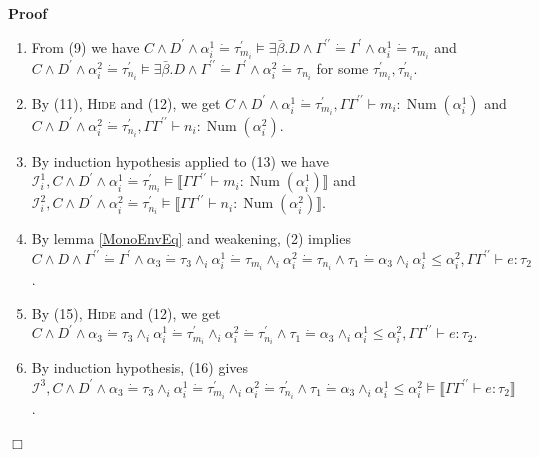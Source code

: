 \documentclass{article}
\newcommand{\tmname}[1]{\textsc{#1}}
\newcommand{\tmop}[1]{\ensuremath{\operatorname{#1}}}
\newenvironment{proof}{\noindent\textbf{Proof\ }}{\hspace*{\fill}$\Box$\medskip}
\begin{document}
\begin{proof}
\begin{itemize}
\begin{enumerate}
      \item From (9) we have $C \wedge D^{\prime} \wedge \alpha^1_i \dot{=}
      \tau_{m_i}^{\prime} \vDash \exists \bar{\beta} .D \wedge
      \Gamma^{\prime\prime} \dot{=} \Gamma^{\prime} \wedge \alpha^1_i \dot{=}
      \tau_{m_i}$ and $C \wedge D^{\prime} \wedge \alpha^2_i \dot{=}
      \tau_{n_i}^{\prime} \vDash \exists \bar{\beta} .D \wedge
      \Gamma^{\prime\prime} \dot{=} \Gamma^{\prime} \wedge \alpha^2_i \dot{=}
      \tau_{n_i}$ for some $\tau_{m_i}^{\prime}, \tau_{n_i}^{\prime}$.
      
      \item By (11), {\tmname{Hide}} and (12), we get $C \wedge D^{\prime}
      \wedge \alpha^1_i \dot{=} \tau_{m_i}^{\prime}, \Gamma
      \Gamma^{\prime\prime} \vdash m_i : \tmop{Num} (\alpha^1_i)$ and $C
      \wedge D^{\prime} \wedge \alpha^2_i \dot{=} \tau_{n_i}^{\prime}, \Gamma
      \Gamma^{\prime\prime} \vdash n_i : \tmop{Num} (\alpha^2_i)$.
      
      \item By induction hypothesis applied to (13) we have $\mathcal{I}_i^1,
      C \wedge D^{\prime} \wedge \alpha^1_i \dot{=} \tau_{m_i}^{\prime} \vDash
      \llbracket \Gamma \Gamma^{\prime\prime} \vdash m_i : \tmop{Num}
      (\alpha^1_i) \rrbracket$ and $\mathcal{I}_i^2, C \wedge D^{\prime}
      \wedge \alpha^2_i \dot{=} \tau_{n_i}^{\prime} \vDash \llbracket \Gamma
      \Gamma^{\prime\prime} \vdash n_i : \tmop{Num} (\alpha^2_i) \rrbracket$.
      
      \item By lemma \ref{MonoEnvEq} and weakening, (2) implies $C \wedge D
      \wedge \Gamma^{\prime\prime} \dot{=} \Gamma^{\prime} \wedge \alpha_3
      \dot{=} \tau_3 \wedge_i \alpha^1_i \dot{=} \tau_{m_i} \wedge_i
      \alpha^2_i \dot{=} \tau_{n_i} \wedge \tau_1 \dot{=} \alpha_3 \wedge_i
      \alpha_i^1 \leq \alpha_i^2, \Gamma \Gamma^{\prime\prime} \vdash e :
      \tau_2$.
      
      \item By (15), {\tmname{Hide}} and (12), we get $C \wedge D^{\prime}
      \wedge \alpha_3 \dot{=} \tau_3 \wedge_i \alpha^1_i \dot{=}
      \tau_{m_i}^{\prime} \wedge_i \alpha^2_i \dot{=} \tau_{n_i}^{\prime}
      \wedge \tau_1 \dot{=} \alpha_3 \wedge_i \alpha_i^1 \leq \alpha_i^2,
      \Gamma \Gamma^{\prime\prime} \vdash e : \tau_2$.
      
      \item By induction hypothesis, (16) gives $\mathcal{I}^3, C \wedge
      D^{\prime} \wedge \alpha_3 \dot{=} \tau_3 \wedge_i \alpha^1_i \dot{=}
      \tau_{m_i}^{\prime} \wedge_i \alpha^2_i \dot{=} \tau_{n_i}^{\prime}
      \wedge \tau_1 \dot{=} \alpha_3 \wedge_i \alpha_i^1 \leq \alpha_i^2
      \vDash \llbracket \Gamma \Gamma^{\prime\prime} \vdash e : \tau_2
      \rrbracket$.
      

\end{enumerate}
\end{itemize}
\end{proof}
\end{document}
